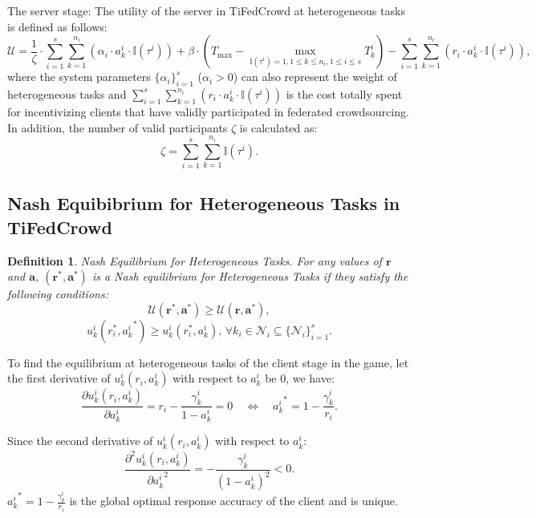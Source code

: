 \documentclass[final,1p,times]{elsarticle}
\newtheorem{myDef}{Definition}
\begin{document}
The server stage: The utility of the server in TiFedCrowd at heterogeneous tasks is defined as follows:
\begin{equation}
	\mathcal{U} = \frac{1}{\zeta}\cdot \sum_{i=1}^{s}\sum_{k=1}^{n_i}\left(\alpha_i\cdot a_k^i\cdot \mathbb{I}(\tau^i)\right) + \beta\cdot(T_{\max}-\max_{\mathbb{I}(\tau^i)=1,1\le k\le n_i,1\le i\le s}T_k^i) - \sum_{i=1}^{s}\sum_{k=1}^{n_i}\left(r_i\cdot a_k^i\cdot \mathbb{I}(\tau^i)\right),
\end{equation}
where the system parameters $\{\alpha_i\}_{i=1}^s$ ($\alpha_i>0$) can also represent the weight of heterogeneous tasks and $\sum_{i=1}^{s}\sum_{k=1}^{n_i}\left(r_i\cdot a_k^i\cdot \mathbb{I}(\tau^i)\right)$ is the cost totally spent for incentivizing clients that have validly participated in federated crowdsourcing. In addition, the number of valid participants $\zeta$ is calculated as: 
\begin{equation}
	\zeta = \sum_{i=1}^{s}\sum_{k=1}^{n_i}\mathbb{I}(\tau^i).
\end{equation}
\subsection{Nash Equibibrium for Heterogeneous Tasks in TiFedCrowd}
\begin{myDef}
	Nash Equilibrium for Heterogeneous Tasks. For any values of $\bm{r}$ and $\bm{a}$, $(\bm{r}^\ast,\bm{a}^\ast)$ is a Nash equilibrium for Heterogeneous Tasks if they satisfy the following conditions:
	\begin{equation}
		\mathcal{U}(\bm{r}^\ast,\bm{a}^\ast) \ge \mathcal{U}(\bm{r},\bm{a}^\ast),
	\end{equation}	
	\begin{equation}
		u_k^i(r_i^\ast,{a_k^i}^\ast) \ge u_k^i(r_i^\ast,a_k^i),\, \forall k_i\in\bm{\mathcal{N}}_i\subseteq\{\bm{\mathcal{N}}_i\}_{i=1}^s.
	\end{equation}	
\end{myDef}

To find the equilibrium at heterogeneous tasks of the client stage in the game, let the first derivative of $u_k^i(r_i,a_k^i)$ with respect to $a_k^i$ be $0$, we have:
\begin{equation}
	\frac{\partial u_k^i(r_i,a_k^i)}{\partial a_k^i} = r_i-\frac{\gamma_k^i}{1-a_k^i} = 0 \quad
	\Leftrightarrow\quad {a_k^i}^\ast = 1 - \frac{\gamma_k^i}{r_i}.
\end{equation}	

Since the second derivative of $u_k^i(r_i,a_k^i)$ with respect to $a_k^i$:
\begin{equation}
	\frac{\partial^2 u_k^i(r_i,a_k^i)}{\partial {a_k^i}^2} = - \frac{\gamma_k^i}{(1-a_k^i)^2} < 0.
\end{equation}	
${a_k^i}^\ast = 1 - \frac{\gamma_k^i}{r_i}$ is the global optimal response accuracy of the client and is unique.
\end{document}
